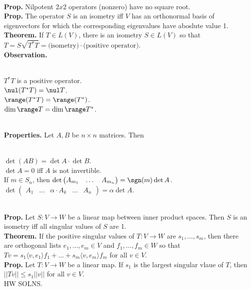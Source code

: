 	\\ \textbf{Prop. } Nilpotent $2x2$ operators (nonzero) have no square root. 
	\\ \textbf{Prop. } The operator $S$ is an isometry iff $V$ has an orthonormal basis of eigenvectors for which the corresponding eigenvalues have aboslute value 1. 
	\\ \textbf{Theorem. } If $T \in L(V)$, there is an isometry $S \in L(V)$ so that $T = S \sqrt{T^*T} = \textrm{(isometry)} \cdot \textrm{(positive operator)}$. 
	\\ \textbf{Observation. } 
	\begin{enumerate}
		\\ $T^*T$ is a positive operator. 
		\\ $\nul(T^*T) = \nul T$. 
		\\ $\range(T^*T) = \range(T^*)$. 
		\\ $\dim\range T = \dim\range T^*$. 
	\end{enumerate}
	\\ \textbf{Properties. } Let $A,B$ be $n \times n$ matrices. Then 
	\begin{enumerate}
		\\ $\det(AB) = \det A \cdot \det B$. 
		\\ $\det A  = 0$ iff $A$ is not invertible. 
		\\ If $m \in S_n$, then $\det \begin{pmatrix} A_{m_1} & \dots & A_{m_n} \end{pmatrix} = \sgn(m) \det A$. 
		\\ $\det \begin{pmatrix} A_1 & \dots & \alpha \cdot A_k & \dots & A_n \end{pmatrix} = \alpha\det A$. 
	\end{enumerate}
	\\ \textbf{Prop. } Let $S: V \to W$ be a linear map between inner product spaces. Then $S$ is an isometry iff all singular values of $S$ are 1. 	
	\\ \textbf{Theorem. } If the positive singular values of $T: V \to W$ are $s_1,\dots,s_m$, then there are orthogonal lists $e_1,\dots,e_m \in V$ and $f_1,\dots,f_m \in W$ so that $Tv = s_1\langle v,e_1 \rangle f_1 + \dots + s_m \langle v,e_m \rangle f_m$ for all $v \in V$. 
	\\ \textbf{Prop. } Let $T: V \to W$ be a linear map. If $s_1$ is the largest singular vlaue of $T$, then $||Tv|| \leq s_1 ||v||$ for all $v \in V$. 
	\\ HW SOLNS. 
